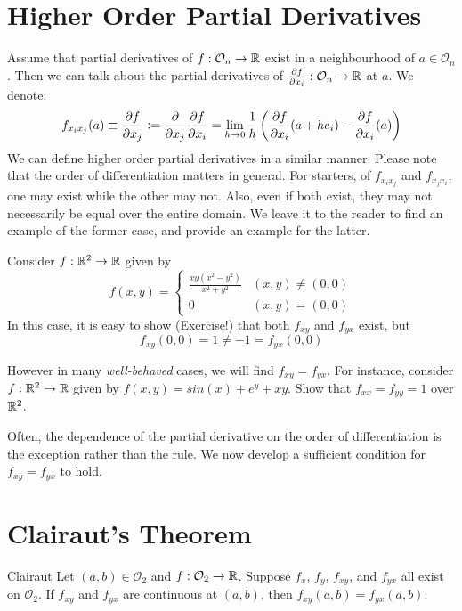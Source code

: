\documentclass[../Analysis-3.tex]{subfiles}
\begin{document}
\section{Higher Order Partial Derivatives}

Assume that partial derivatives of $f: \mathcal{O}_n \to \mathbb{R}$ exist in a neighbourhood of $a \in \mathcal{O}_n $. Then we can talk about the partial derivatives of $\pdv{f}{x_i}: \mathcal{O}_n \to \mathbb{R}$ at $a$. We denote:
\[f_{x_i x_j}(a) \equiv \pdv{f}{x_j} \mathrel{\mathop:}= \frac{\partial}{\partial x_j} \pdv{f}{x_i} = \lim_{h \to 0} \frac{1}{h} \left( \pdv{f}{x_i}\/(a+h e_i)- \pdv{f}{x_i}\/ (a) \right)
\]
We can define higher order partial derivatives in a similar manner. Please note that the order of differentiation matters in general. For starters, of  $f_{x_i x_j}$ and $f_{x_j x_i}$, one may exist while the other may not. Also, even if both exist, they may not necessarily be equal over the entire domain. We leave it to the reader to find an example of the former case, and provide an example for the latter.

\begin{Eg}{}{}
  Consider $f: \mathbb{R}^2 \to \mathbb{R}$ given by
  \[
    f(x,y) =
    \begin{cases}
      \frac{xy(x^2 - y^2)}{x^2 + y^2} & (x,y) \neq (0,0) \\
      0                               & (x,y) = (0,0)
    \end{cases}
  \]
  In this case, it is easy to show (Exercise!) that both $f_{xy}$ and $f_{yx}$ exist, but
  \[f_{xy}(0,0) = 1 \neq -1 = f_{yx}(0,0)\]
\end{Eg}

\begin{Eg}{}{}
  However in many \emph{well-behaved} cases, we will find $f_{xy} = f_{yx}$.
  For instance, consider $f: \mathbb{R}^2 \to \mathbb{R}$ given by $f(x,y) = sin(x) + e^y + xy$. Show that $f_{xx} = f_{yy} = 1$ over $\mathbb{R}^2$.
\end{Eg}

Often, the dependence of the partial derivative on the order of differentiation is the exception rather than the rule. We now develop a sufficient condition for $f_{xy} = f_{yx}$ to hold.

\section{Clairaut's Theorem}

\begin{Thm}{Clairaut}{}\label{thm1:19}
  Let $(a,b) \in \mathcal{O}_2$ and $f:\mathcal{O}_2 \to \mathbb{R}$. Suppose $f_x$, $f_y$, $f_{xy}$, and $f_{yx}$ all exist on $\mathcal{O}_2$. If $f_{xy}$ and $f_{yx}$ are continuous at $(a,b)$, then $f_{xy}(a,b) = f_{yx}(a,b)$.
\end{Thm}
\end{document}
